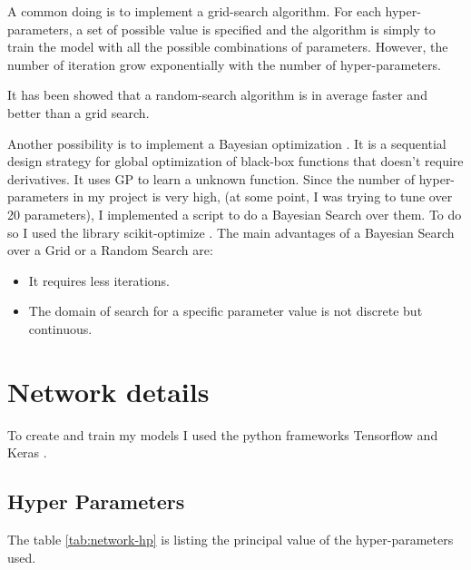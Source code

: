 \documentclass[12pt]{report}
\begin{document}
A common doing is to implement a grid-search algorithm.
For each hyper-parameters, a set of possible value is specified and the algorithm is simply to train the model with all the possible combinations of parameters.
However, the number of iteration grow exponentially with the number of hyper-parameters.

It has been showed that a random-search algorithm is in average faster and better than a grid search.

Another possibility is to implement a Bayesian optimization \cite{frazier_tutorial_2018, adams_tutorial_nodate}.
It is a sequential design strategy for global optimization of black-box functions that doesn't require derivatives.
It uses GP to learn a unknown function.
Since the number of hyper-parameters in my project is very high, (at some point, I was trying to tune over 20 parameters), I implemented a script to do a Bayesian Search over them.
To do so I used the library scikit-optimize \cite{noauthor_scikit-optimize_nodate}.
The main advantages of a Bayesian Search over a Grid or a Random Search are:
\begin{itemize}
    \item It requires less iterations.
    \item The domain of search for a specific parameter value is not discrete but continuous.
\end{itemize}


\section{Network details}

To create and train my models I used the python frameworks Tensorflow \cite{noauthor_tensorflow_nodate} and Keras \cite{noauthor_keras_nodate}.

\subsection{Hyper Parameters}

The table \ref{tab:network-hp} is listing the principal value of the hyper-parameters used.
\end{document}
